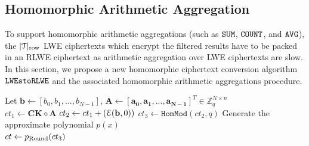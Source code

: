 \subsection{Homomorphic Arithmetic Aggregation}\label{block: LWEsPack}
To support homomorphic arithmetic aggregations 
(such as $\texttt{SUM}$, $\texttt{COUNT}$, and $\texttt{AVG}$), 
the $|\mathcal{T}|_{\rm row}$ LWE ciphertexts which encrypt the filtered results
have to be packed in an RLWE ciphertext 
as arithmetic aggregation over LWE ciphertexts are slow.
In this section, we propose a new homomorphic ciphertext conversion
algorithm $\repack$ and the associated 
homomorphic arithmetic aggregations procedure.

\begin{algorithm}[t!]
    \caption{$\repack$}
    \label{algo: lwespack}
     Let $\mathbf{b} \leftarrow [b_0, b_1, ...,b_{N-1}]$, 
     $\mathbf{A} \leftarrow [\mathbf{a_0}, \mathbf{a_1}, ..., \mathbf{a_{N-1}}]^{T} \in \mathbb{Z}_{q}^{N \times n}$\\
     $ct_1 \leftarrow \mathbf{CK} \diamond \mathbf{A}$
     $ct_2 \leftarrow ct_1 + (\mathcal{E}(\mathbf{b},0))$
     $ct_3 \leftarrow\texttt{HomMod}(ct_2, q)$
     Generate the approximate polynomial $p(x)$ \\
     $ct \leftarrow p_{\rm Round}(ct_3)$
\end{algorithm}

